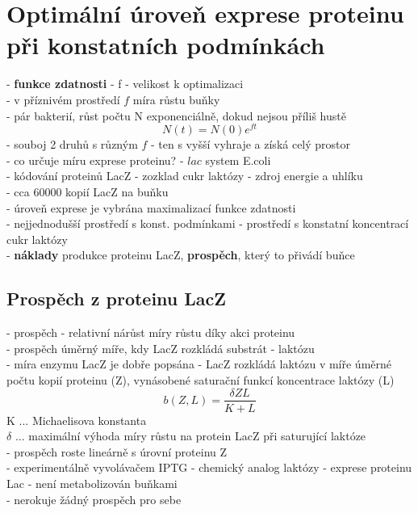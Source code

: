 \documentclass[11pt,a4paper]{report}
\begin{document}
\section{Optimální úroveň exprese proteinu při konstatních podmínkách}
- \textbf{funkce zdatnosti} - f - velikost k optimalizaci\\
\indent - v příznivém prostředí $f$ míra růstu buňky\\
- pár bakterií, růst počtu N exponenciálně, dokud nejsou příliš hustě
\begin{equation}
N(t)=N(0)e^{ft}
\end{equation}
- souboj 2 druhů s různým $f$ - ten s vyšší vyhraje a získá celý prostor\\
- co určuje míru exprese proteinu? - $lac$ system E.coli\\
\indent - kódování proteinů LacZ - zozklad cukr laktózy - zdroj energie a uhlíku\\
\indent \indent - cca 60000 kopií LacZ na buňku\\
\indent - úroveň exprese je vybrána maximalizací funkce zdatnosti\\
\indent - nejjednodušší prostředí s konst. podmínkami - prostředí s konstatní koncentrací cukr laktózy\\
- \textbf{náklady} produkce proteinu LacZ, \textbf{prospěch}, který to přivádí buňce\\

\subsection{Prospěch z proteinu LacZ}
- prospěch - relativní nárůst míry růstu díky akci proteinu\\
- prospěch úměrný míře, kdy LacZ rozkládá substrát - laktózu\\
- míra enzymu LacZ je dobře popsána - LacZ rozkládá laktózu v míře úměrné počtu kopií proteinu (Z), vynásobené saturační funkcí koncentrace laktózy (L)\\
\begin{equation}
b(Z,L)=\frac{\delta ZL}{K+L}
\end{equation}
\indent K ... Michaelisova konstanta\\
\indent $\delta$ ... maximální výhoda míry růstu na protein LacZ při saturující laktóze\\
- prospěch roste lineárně s úrovní proteinu Z\\
- experimentálně vyvolávačem IPTG - chemický analog laktózy - exprese proteinu Lac - není metabolizován buňkami\\
\indent - nerokuje žádný prospěch pro sebe\\
\end{document}

